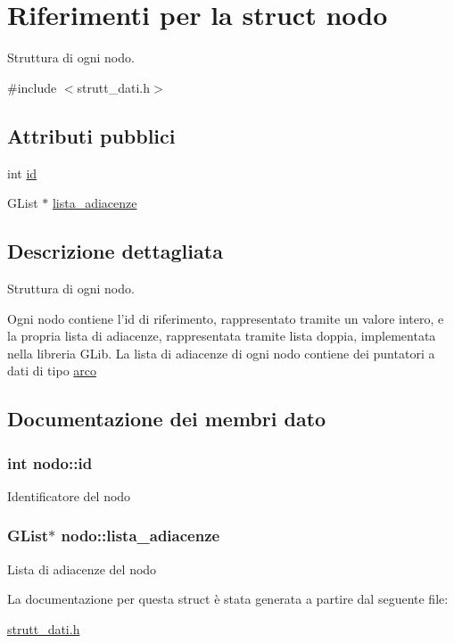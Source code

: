 \hypertarget{structnodo}{\section{Riferimenti per la struct nodo}
\label{structnodo}
}


Struttura di ogni nodo.  




{\ttfamily \#include $<$strutt\+\_\+dati.\+h$>$}

\subsection*{Attributi pubblici}
\begin{DoxyCompactItemize}
\item 
int \hyperlink{structnodo_ab666271a6c7a11224dff5d682f5b0473}{id}
\item 
G\+List $\ast$ \hyperlink{structnodo_a94b362e3d649f0289bbd3200d127e269}{lista\+\_\+adiacenze}
\end{DoxyCompactItemize}


\subsection{Descrizione dettagliata}
Struttura di ogni nodo. 

Ogni nodo contiene l'id di riferimento, rappresentato tramite un valore intero, e la propria lista di adiacenze, rappresentata tramite lista doppia, implementata nella libreria G\+Lib. La lista di adiacenze di ogni nodo contiene dei puntatori a dati di tipo \hyperlink{structarco}{arco} 

\subsection{Documentazione dei membri dato}
\hypertarget{structnodo_ab666271a6c7a11224dff5d682f5b0473}{
\subsubsection[{id}]{\setlength{\rightskip}{0pt plus 5cm}int nodo\+::id}}\label{structnodo_ab666271a6c7a11224dff5d682f5b0473}
Identificatore del nodo \hypertarget{structnodo_a94b362e3d649f0289bbd3200d127e269}{
\subsubsection[{lista\+\_\+adiacenze}]{\setlength{\rightskip}{0pt plus 5cm}G\+List$\ast$ nodo\+::lista\+\_\+adiacenze}}\label{structnodo_a94b362e3d649f0289bbd3200d127e269}
Lista di adiacenze del nodo 

La documentazione per questa struct è stata generata a partire dal seguente file\+:\begin{DoxyCompactItemize}
\item 
\hyperlink{strutt__dati_8h}{strutt\+\_\+dati.\+h}\end{DoxyCompactItemize}
